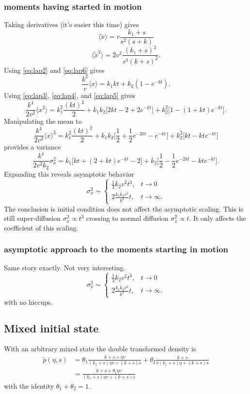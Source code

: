 \documentclass[11pt]{article}
\newcommand\be{\begin{equation}} %
\newcommand\ee{\end{equation}}   %
\newcommand\bra{\langle}
\newcommand\ket{\rangle}
\begin{document}
\subsubsection{moments having started in motion}
Taking derivatives (it's easier this time) gives 
\be \bra \tilde{x} \ket = v \frac{k_1 + s}{s^2(s+k)} \ee
\be \bra \tilde{x}^2 \ket = 2v^2 \frac{(k_1+s)^2}{s^3(k+s)^2}.\ee
Using \ref{eq:lap2} and \ref{eq:lap6} gives
\be \frac{k^2}{v}\bra x \ket = k_1 kt + k_2(1-e^{-kt}).\ee
Using \ref{eq:lap3}, \ref{eq:lap4}, and \ref{eq:lap5} gives
\be \frac{k^4}{2v^2}\bra x^2\ket = k_1^2 \frac{(kt)^2}{2} + k_1 k_2 \Big[2kt-2+2e^{-kt}\Big] + k_2^2 \Big[1-(1+kt)e^{-kt}\Big].\ee
Manipulating the mean to 
\be \frac{k^4}{2v^2}\bra x\ket^2 = k_1^2 \frac{(kt)^2}{2} + k_1 k_2\Big[\frac{1}{2}+ \frac{1}{2}e^{-2kt}-e^{-kt}\Big] + k_2^2\Big[kt -kte^{-kt}\Big]\ee
provides a variance
\be \frac{k^4}{2v^2k_2}\sigma_x^2 = k_1\Big[kt + (2+kt)e^{-kt} -2\Big] 
+ k_2\Big[\frac{1}{2} - \frac{1}{2}e^{-2kt} - kt e^{-kt}\Big].\ee
Expanding this reveals asymptotic behavior 
\be \sigma_x^2 \sim 
\begin{cases}
	\frac{1}{3}k_2v^2 t^3, & t\rightarrow 0 \\
	2\frac{k_1k_2 v^2}{k^3} t, & t \rightarrow \infty.
\end{cases} \label{eq:sim}\ee
The conclusion is initial condition does not affect the asymptotic scaling.
This is still super-diffusion $\sigma_x^2 \propto t^3$ crossing to normal diffusion $\sigma_x^2 \propto t$.
It only affects the coefficient of this scaling. 
\subsubsection{asymptotic approach to the moments starting in motion}
Same story exactly. Not very interesting.
\be \sigma_x^2 \sim 
\begin{cases}
	\frac{1}{3}k_2v^2 t^3, & t\rightarrow 0 \\
	2\frac{k_1k_2 v^2}{k^3} t, & t \rightarrow \infty.
\end{cases} \label{eq:sim}\ee
with no hiccups.
\subsection{Mixed initial state}
With an arbitrary mixed state the double transformed density is 
\begin{align}
\tilde{p}(\eta,s) &= \theta_1 \frac{k + s + \eta v }{(k_1+s) \eta v  + (k+s)s } + \theta_2\frac{k+s}{v(k_1+s)\eta + (k+s)s}\\
&=  \frac{k + s + \theta_1 \eta v }{(k_1+s) \eta v  + (k+s)s }
\end{align}
with the identity $\theta_1+\theta_2=1$.
\end{document}
